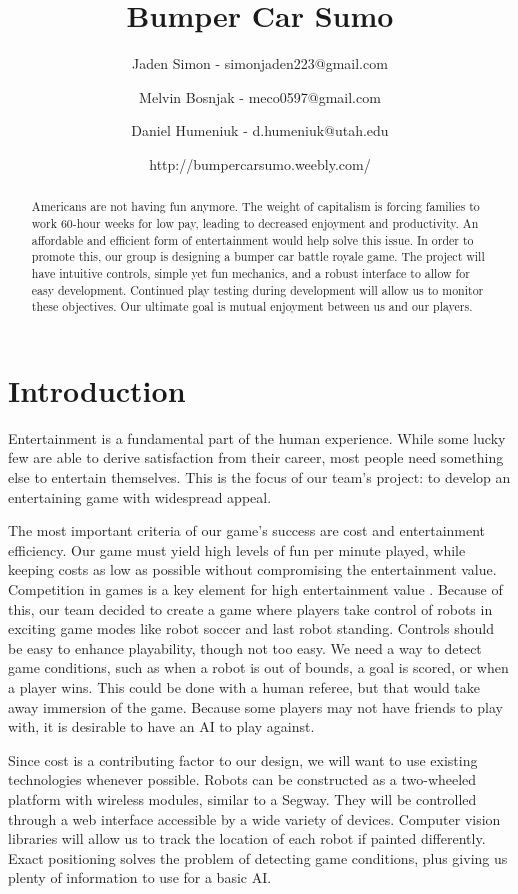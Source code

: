 \documentclass[11pt]{ieeeconf}
\title{Bumper Car Sumo}
\author{Jaden Simon - simonjaden223@gmail.com \\ \and
	   Melvin Bosnjak - meco0597@gmail.com \\ \and
	   Daniel Humeniuk - d.humeniuk@utah.edu \\ \and
	   http://bumpercarsumo.weebly.com/}
\begin{document}
\maketitle

\begin{abstract}
Americans are not having fun anymore. The weight of capitalism is forcing families to work 60-hour weeks for low pay, leading to decreased enjoyment and productivity. An affordable and efficient form of entertainment would help solve this issue. In order to promote this, our group is designing a bumper car battle royale game. The project will have intuitive controls, simple yet fun mechanics, and a robust interface to allow for easy development. Continued play testing during development will allow us to monitor these objectives. Our ultimate goal is mutual enjoyment between us and our players.
\end{abstract}

\section{Introduction}
Entertainment is a fundamental part of the human experience. While some lucky few are able to derive satisfaction from their career, most people need something else to entertain themselves. This is the focus of our team's project: to develop an entertaining game with widespread appeal.

 The most important criteria of our game’s success are cost and entertainment efficiency. Our game must yield high levels of fun per minute played, while keeping costs as low as possible without compromising the entertainment value. Competition in games is a key element for high entertainment value \cite{vord:03}.  Because of this, our team decided to create a game where players take control of robots in exciting game modes like robot soccer and last robot standing. Controls should be easy to enhance playability, though not too easy. We need a way to detect game conditions, such as when a robot is out of bounds, a goal is scored, or when a player wins. This could be done with a human referee, but that would take away immersion of the game. Because some players may not have friends to play with, it is desirable to have an AI to play against. 

Since cost is a contributing factor to our design, we will want to use existing technologies whenever possible. Robots can be constructed as a two-wheeled platform with wireless modules, similar to a Segway. They will be controlled through a web interface accessible by a wide variety of devices. Computer vision libraries will allow us to track the location of each robot if painted differently. Exact positioning solves the problem of detecting game conditions, plus giving us plenty of information to use for a basic AI. 
\end{document}
